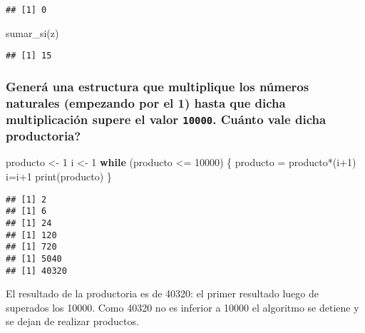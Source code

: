 \documentclass[
]{article}
\newenvironment{Shaded}{\begin{snugshade}}{\end{snugshade}}
\newcommand{\ControlFlowTok}[1]{\textcolor[rgb]{0.13,0.29,0.53}{\textbf{#1}}}
\newcommand{\DecValTok}[1]{\textcolor[rgb]{0.00,0.00,0.81}{#1}}
\newcommand{\FunctionTok}[1]{\textcolor[rgb]{0.00,0.00,0.00}{#1}}
\newcommand{\NormalTok}[1]{#1}
\newcommand{\OtherTok}[1]{\textcolor[rgb]{0.56,0.35,0.01}{#1}}
\newcommand{\SpecialCharTok}[1]{\textcolor[rgb]{0.00,0.00,0.00}{#1}}
\begin{document}
\begin{verbatim}
## [1] 0
\end{verbatim}

\begin{Shaded}
\begin{Highlighting}[]
\FunctionTok{sumar\_si}\NormalTok{(z)}
\end{Highlighting}
\end{Shaded}

\begin{verbatim}
## [1] 15
\end{verbatim}

\hypertarget{generuxe1-una-estructura-que-multiplique-los-nuxfameros-naturales-empezando-por-el-1-hasta-que-dicha-multiplicaciuxf3n-supere-el-valor-10000.-cuuxe1nto-vale-dicha-productoria}{%
\subsubsection{\texorpdfstring{Generá una estructura que multiplique los
números naturales (empezando por el 1) hasta que dicha multiplicación
supere el valor \texttt{10000}. Cuánto vale dicha
productoria?}{Generá una estructura que multiplique los números naturales (empezando por el 1) hasta que dicha multiplicación supere el valor 10000. Cuánto vale dicha productoria?}}\label{generuxe1-una-estructura-que-multiplique-los-nuxfameros-naturales-empezando-por-el-1-hasta-que-dicha-multiplicaciuxf3n-supere-el-valor-10000.-cuuxe1nto-vale-dicha-productoria}}

\begin{Shaded}
\begin{Highlighting}[]
\NormalTok{producto }\OtherTok{\textless{}{-}} \DecValTok{1}
\NormalTok{i }\OtherTok{\textless{}{-}} \DecValTok{1}
\ControlFlowTok{while}\NormalTok{ (producto }\SpecialCharTok{\textless{}=} \DecValTok{10000}\NormalTok{) \{}
\NormalTok{  producto }\OtherTok{=}\NormalTok{ producto}\SpecialCharTok{*}\NormalTok{(i}\SpecialCharTok{+}\DecValTok{1}\NormalTok{)}
\NormalTok{  i}\OtherTok{=}\NormalTok{i}\SpecialCharTok{+}\DecValTok{1}
  \FunctionTok{print}\NormalTok{(producto)}
\NormalTok{\}}
\end{Highlighting}
\end{Shaded}

\begin{verbatim}
## [1] 2
## [1] 6
## [1] 24
## [1] 120
## [1] 720
## [1] 5040
## [1] 40320
\end{verbatim}

El resultado de la productoria es de 40320: el primer resultado luego de
superados los 10000. Como 40320 no es inferior a 10000 el algoritmo se
detiene y se dejan de realizar productos.
\end{document}
